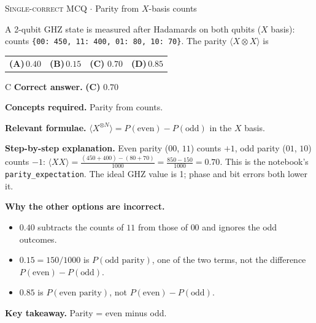 \documentclass[11pt,a4paper]{article}
\newcommand{\optlabel}[1]{\textbf{(#1)}}
\newcommand{\correctlabel}[1]{\textcolor{okgreen}{\textbf{(#1)}\,\ding{51}}}
\newenvironment{qitem}[1]{\begin{list}{}{\setlength{\leftmargin}{3.3em}\setlength{\labelwidth}{3.1em}%
  \setlength{\labelsep}{0.2em}\setlength{\topsep}{3pt}\setlength{\parsep}{3pt}}\item[\textbf{Q.#1}\hfill]}{\end{list}}
\newcommand{\qsep}{\par\vspace{2pt}{\color{black!15}\hrule}\vspace{4pt}}
\newcommand{\qmeta}[2]{{\footnotesize\color{black!60}\textsc{#1} \;$\cdot$\; #2}\par}
\begin{document}
\begin{qitem}{52}
\qmeta{Single-correct MCQ}{Parity from $X$-basis counts}
A 2-qubit GHZ state is measured after Hadamards on both qubits ($X$ basis): counts \texttt{\{00: 450, 11: 400, 01: 80, 10: 70\}}. The parity
$\langle X\otimes X\rangle$ is
\par\smallskip\noindent\begin{tabularx}{\linewidth}{@{}*{4}{L}@{}}
\optlabel{A}\,$0.40$ & \optlabel{B}\,$0.15$ & \correctlabel{C}\,$0.70$ & \optlabel{D}\,$0.85$
\end{tabularx}
\end{qitem}
\begin{solbox}{C}
\textbf{\color{brand}Correct answer.} \textcolor{okgreen}{\textbf{(C)}} $0.70$

\textbf{\color{brand}Concepts required.} Parity from counts.

\textbf{\color{brand}Relevant formulae.} $\langle X^{\otimes N}\rangle = P(\text{even}) - P(\text{odd})$ in the $X$ basis.

\textbf{\color{brand}Step-by-step explanation.} Even parity ($00$, $11$) counts $+1$, odd parity ($01$, $10$) counts $-1$: $\langle XX\rangle = \frac{(450 + 400) - (80 + 70)}{1000} = \frac{850 - 150}{1000} = 0.70$.
This is the notebook's \texttt{parity\_expectation}. The ideal GHZ value is 1; phase and bit errors both lower it.

\textbf{\color{brand}Why the other options are incorrect.}
\begin{itemize}[leftmargin=2.4em, itemsep=1pt, topsep=2pt]
\item[\textbf{(A)}] $0.40$ subtracts the counts of $11$ from those of $00$ and ignores the odd outcomes.
\item[\textbf{(B)}] $0.15 = 150/1000$ is $P(\text{odd parity})$, one of the two terms, not the difference $P(\text{even}) - P(\text{odd})$.
\item[\textbf{(D)}] $0.85$ is $P(\text{even parity})$, not $P(\text{even}) - P(\text{odd})$.
\end{itemize}
\textbf{\color{brand}Key takeaway.} Parity = even minus odd.
\end{solbox}
\qsep
\end{document}
